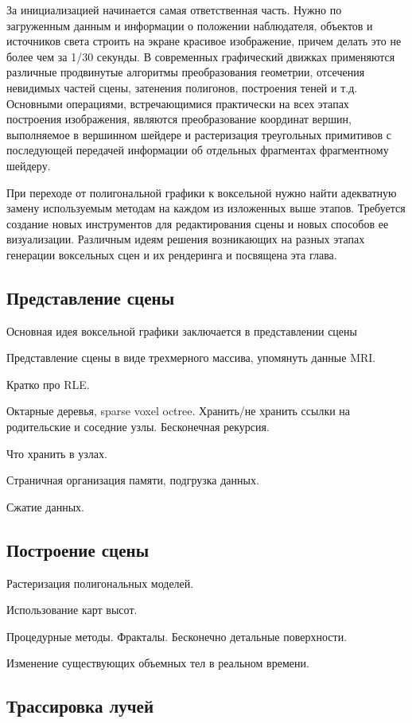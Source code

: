 \documentclass[a4paper,12pt,oneside]{article}
\begin{document}
За инициализацией начинается самая ответственная часть. Нужно по загруженным данным и информации о положении наблюдателя, объектов и источников света строить на экране красивое изображение, причем делать это не более чем за 1/30 секунды. В современных графический движках применяются различные продвинутые алгоритмы преобразования геометрии, отсечения невидимых частей сцены, затенения полигонов, построения теней и т.д. Основными операциями, встречающимися практически на всех этапах построения изображения, являются преобразование координат вершин, выполняемое в вершинном шейдере и растеризация треугольных примитивов с последующей передачей информации об отдельных фрагментах фрагментному шейдеру.

При переходе от полигональной графики к воксельной нужно найти адекватную замену используемым методам на каждом из изложенных выше этапов. Требуется создание новых инструментов для редактирования сцены и новых способов ее визуализации. Различным идеям решения возникающих на разных этапах генерации воксельных сцен и их рендеринга и посвящена эта глава.

\subsection{Представление сцены}

Основная идея воксельной графики заключается в представлении сцены 

Представление сцены в виде трехмерного массива, упомянуть данные MRI.

Кратко про RLE.

Октарные деревья, sparse voxel octree. Хранить/не хранить ссылки на родительские и соседние узлы. Бесконечная рекурсия.

Что хранить в узлах.

Страничная организация памяти, подгрузка данных.

Сжатие данных.

\subsection{Построение сцены}

Растеризация полигональных моделей.

Использование карт высот.

Процедурные методы. Фракталы. Бесконечно детальные поверхности.

Изменение существующих объемных тел в реальном времени.

\subsection{Трассировка лучей}
\end{document}
